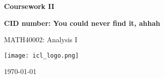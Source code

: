 \documentclass[10pt, a4paper]{article}
\begin{document}
\begin{titlepage}
    \begin{center}
        \vspace*{3cm}
            
        \Huge
        \textbf{
            Coursework II}
            
            
        \vspace{1.5cm}
        \Large
            
        \textbf{
        CID number: You could never find it, ahhah}%
        
            
        \vfill
        
MATH40002: Analysis I
        \vspace{1cm}
            
        \texttt{[image: icl\_logo.png]}
        \\
        
        \Large
        
        \today
            
    \end{center}
\end{titlepage}
\end{document}
